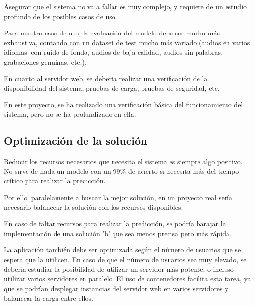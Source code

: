 Asegurar que el sistema no va a fallar es muy complejo, y requiere de un estudio profundo de los posibles casos de uso.

Para nuestro caso de uso, la evaluación del modelo debe ser mucho más exhaustiva, contando con un dataset de test mucho más variado (audios en varios idiomas, con ruido de fondo, audios de baja calidad, audios sin palabras, grabaciones genuinas, etc.).

En cuanto al servidor web, se debería realizar una verificación de la disponibilidad del sistema, pruebas de carga, pruebas de seguridad, etc.

En este proyecto, se ha realizado una verificación básica del funcionamiento del sistema, pero no se ha profundizado en ella.



\subsection{Optimización de la solución}
Reducir los recursos necesarios que necesita el sistema es siempre algo positivo.
No sirve de nada un modelo con un 99\% de acierto si necesita más del tiempo crítico para realizar la predicción.

Por ello, paralelamente a buscar la mejor solución, en un proyecto real sería necesario balancear la solución con los recursos disponibles.

En caso de faltar recursos para realizar la predicción, se podría barajar la implementación de una solución 'b' que sea menos precisa pero más rápida.

La aplicación también debe ser optimizada según el número de usuarios que se espera que la utilicen.
En caso de que el número de usuarios sea muy elevado, se debería estudiar la posibilidad de utilizar un servidor más potente, o incluso utilizar varios servidores en paralelo.
El uso de contenedores facilita esta tarea, ya que se podrían desplegar instancias del servidor web en varios servidores y balancear la carga entre ellos.





\endinput